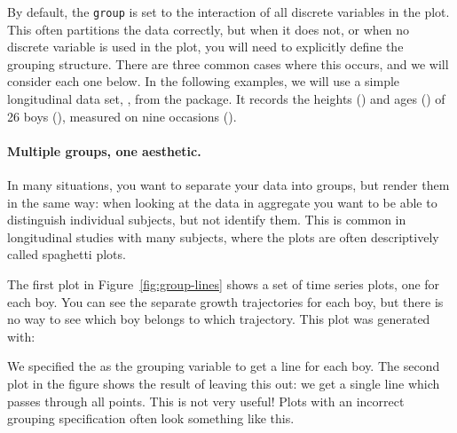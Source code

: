 By default, the {\tt group} is set to the interaction of all discrete variables in the plot.  This often partitions the data correctly, but when it does not, or when no discrete variable is used in the plot, you will need to explicitly define the grouping structure.  There are three common cases where this occurs, and we will consider each one below.  In the following examples, we will use a simple longitudinal data set, , from the  package.  It records the heights () and ages () of 26 boys (), measured on nine occasions (). 

\paragraph{Multiple groups, one aesthetic.} In many situations, you want to separate your data into groups, but render them in the same way: when looking at the data in aggregate you want to be able to distinguish individual subjects, but not identify them.  This is common in longitudinal studies with many subjects, where the plots are often descriptively called spaghetti plots.  

The first plot in Figure~\ref{fig:group-lines} shows a set of time series plots, one for each boy. You can see the separate growth trajectories for each boy, but there is no way to see which boy belongs to which trajectory.  This plot was generated with:

%


\noindent We specified the  as the grouping variable to get a line for each boy. The second plot in the figure shows the result of leaving this out: we get a single line which passes through all points.  This is not very useful! Plots with an incorrect grouping specification often look something like this.

% 


